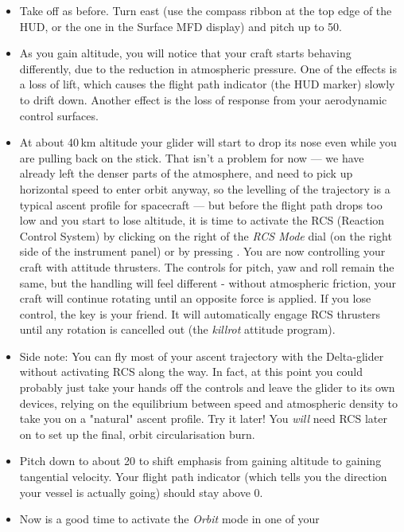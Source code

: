 \documentclass[Orbiter User Manual.tex]{subfiles}
\begin{document}
\begin{itemize}
	\item Take off as before. Turn east (use the compass ribbon at the top edge
		of the HUD, or the one in the Surface MFD display) and pitch up to
		50\deg{}.
	\item As you gain altitude, you will notice that your craft starts behaving
		differently, due to the reduction in atmospheric pressure. One of the
		effects is a loss of lift, which causes the flight path indicator (the
		\prograde{} HUD marker) slowly to drift down. Another effect is the loss
		of response from your aerodynamic control surfaces.
	\item At about 40\,km altitude your glider will start to drop its nose even
		while you are pulling back on the stick. That isn't a problem for now
		--- we have already left the denser parts of the atmosphere, and need to
		pick up horizontal speed to enter orbit anyway, so the levelling of the
		trajectory is a typical ascent profile for spacecraft --- but before the
		flight path drops too low and you start to lose altitude, it is time to
		activate the RCS (Reaction Control System) by clicking on the right of
		the \emph{RCS Mode} dial (on the right side of the instrument panel) or
		by pressing \keystroke{\ctrl,/}\num{}. You are now controlling your craft
		with attitude thrusters. The controls for pitch, yaw and roll remain the
		same, but the handling will feel different - without atmospheric
		friction, your craft will continue rotating until an opposite force is
		applied. If you lose control, the \num{} key is your
		friend. It will automatically engage RCS thrusters until any rotation is
		cancelled out (the \emph{killrot} attitude program).
	\item Side note: You can fly most of your ascent trajectory with the
		Delta-glider without activating RCS along the way. In fact, at this
		point you could probably just take your hands off the controls and leave
		the glider to its own devices, relying on the equilibrium between speed
		and atmospheric density to take you on a "natural" ascent profile. Try
		it later! You \emph{will} need RCS later on to set up the final, orbit
		circularisation burn.
	\item Pitch down to about 20\deg{} to shift emphasis from gaining altitude
		to gaining tangential velocity. Your flight path indicator (which tells
		you the direction your vessel is actually going) should stay above
		0\deg{}.
	\item Now is a good time to activate the \emph{Orbit} mode in one of your

\end{itemize}
\end{document}
